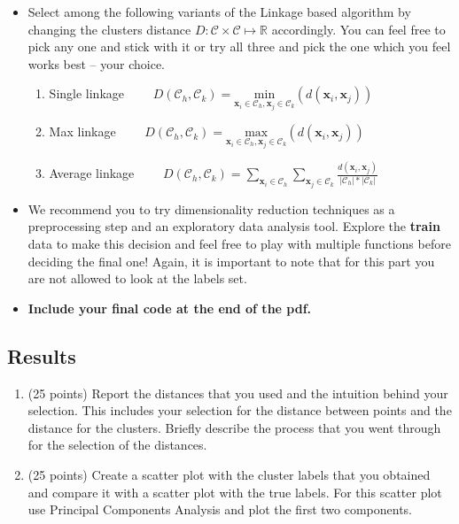 \documentclass{article}
\begin{document}
\begin{itemize}
\item Select among the following variants of the Linkage based algorithm by changing the clusters distance $D: \mathcal{C}\times\mathcal{C}\mapsto \mathbb{R}$ accordingly. You can feel free to pick any one and stick with it or try all three and pick the one which you feel works best -- your choice. 
    \begin{enumerate}
        \item Single linkage
        $\qquad D(\mathcal{C}_{h}, \mathcal{C}_{k})=\underset{\mathbf{x}_{i}\in \mathcal{C}_{h}, \mathbf{x}_{j}\in \mathcal{C}_{k}}{\text{min}}
            \left(d(\mathbf{x}_{i}, \mathbf{x}_{j})\right)$
        \item Max linkage
        $\qquad D(\mathcal{C}_{h}, \mathcal{C}_{k})=\underset{\mathbf{x}_{i}\in \mathcal{C}_{h}, \mathbf{x}_{j}\in \mathcal{C}_{k}}{\text{max}}
            \left(d(\mathbf{x}_{i}, \mathbf{x}_{j})\right)$
        \item Average linkage
        $\qquad D(\mathcal{C}_{h}, \mathcal{C}_{k})= \sum_{\mathbf{x}_i\in\mathcal{C}_{h}}\sum_{\mathbf{x}_j\in\mathcal{C}_{k}} \frac{d(\mathbf{x}_{i}, \mathbf{x}_{j})}{|\mathcal{C}_{h}|*|\mathcal{C}_{k}|}$
    \end{enumerate}
\item We recommend you to try dimensionality reduction techniques as a preprocessing step and an exploratory data analysis tool. Explore the \textbf{train} data to make this decision and feel free to play with multiple functions before deciding the final one! Again, it is important to note that for this part you are not allowed to look at the labels set.

\item \textbf{Include your final code at the end of the pdf.}

\end{itemize}

\subsection{Results}
\begin{enumerate}[a]
\item (25 points) Report the distances that you used and the intuition behind your selection. This includes your selection for the distance between points and the distance for the clusters. Briefly describe the process that you went through for the selection of the distances.

\item (25 points) Create a scatter plot with the cluster labels that you obtained and compare it with a scatter plot with the true labels. For this scatter plot use Principal Components Analysis and plot the first two components.

\end{enumerate}
\end{document}

